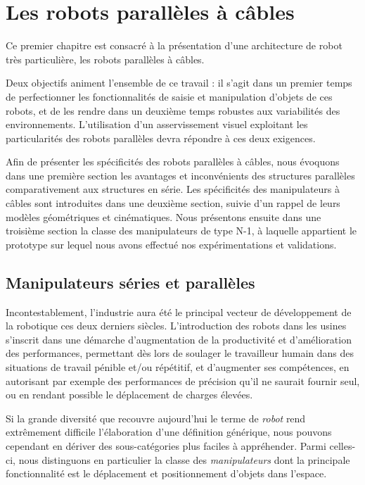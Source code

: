 \chapter{Les robots parall\`eles \`a c\^ables} \label{chap0}

Ce premier chapitre est consacré à la présentation d'une architecture de robot 
très particulière, les robots parall\`eles \`a c\^ables.

Deux objectifs animent l'ensemble de ce travail : il s'agit dans un premier 
temps de perfectionner les fonctionnalités de saisie et manipulation d'objets de 
ces robots, et de les rendre dans un deuxi\`eme temps robustes aux 
variabilit\'es des environnements. L'utilisation d'un asservissement visuel 
exploitant les particularit\'es des robots parall\`eles devra r\'epondre \`a ces 
deux exigences.

Afin de pr\'esenter les sp\'ecificit\'es des robots parall\`eles \`a c\^ables, 
nous  évoquons dans une première section les avantages et inconvénients des 
structures parallèles comparativement aux structures en série. Les spécificités 
des manipulateurs à c\^ables sont introduites dans une deuxième section, suivie 
d'un rappel de leurs modèles géométriques et cinématiques. Nous présentons 
ensuite dans une troisième section la classe des manipulateurs de type N-1, \`a 
laquelle appartient le prototype sur lequel nous avons effectu\'e nos 
expérimentations et validations.

\section{Manipulateurs séries et parallèles} \label{chap0-0}

Incontestablement, l'industrie aura été le principal vecteur de développe\-ment 
de la robotique ces deux derniers siècles. L'introduction des robots dans les 
usines s'inscrit dans une démarche d'augmentation de la productivité et 
d'amélio\-ration des performances, permettant dès lors de soulager le 
travailleur humain dans des situations de travail pénible et/ou répétitif, et 
d'augmenter ses compétences, en autorisant par exemple des performances de 
précision qu'il ne saurait fournir seul, ou en rendant possible le déplacement 
de charges élevées.

Si la grande diversité que recouvre aujourd'hui le terme de {\it robot} rend 
extrê\-mement difficile l'élaboration d'une définition générique, nous pouvons 
cependant en dériver des sous-catégories plus faciles à appréhender. Parmi 
celles-ci, nous distinguons en particulier la classe des {\it manipulateurs} 
dont la principale fonctionnalité est le déplacement et positionnement d'objets 
dans l'espace.


